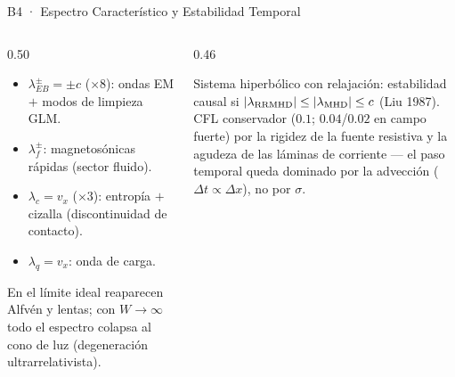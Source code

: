 \documentclass[aspectratio=169,9pt]{beamer}
\begin{document}
\begin{frame}{B4 · Espectro Caracter\'istico y Estabilidad Temporal}
\begin{columns}[T]
\begin{column}{0.50\textwidth}
  \begin{tcolorbox}[EQ={Los 14 autovalores \citep{miranda-aranguren-2018}}]
    \scriptsize
    \begin{itemize}\setlength\itemsep{2pt}
      \item $\lambda^\pm_{EB}=\pm c$ ($\times8$): ondas EM $+$ modos
            de limpieza GLM.
      \item $\lambda_f^\pm$: magnetos\'onicas r\'apidas (sector fluido).
      \item $\lambda_c=v_x$ ($\times3$): entrop\'ia $+$ cizalla
            (discontinuidad de contacto).
      \item $\lambda_q=v_x$: onda de carga.
    \end{itemize}
    En el l\'imite ideal reaparecen Alfv\'en y lentas; con $W\to\infty$
    todo el espectro colapsa al cono de luz (degeneraci\'on
    ultrarrelativista).
  \end{tcolorbox}
\end{column}
\begin{column}{0.46\textwidth}
  \begin{tcolorbox}[RES={Condici\'on subcaracter\'istica y CFL}]
    \scriptsize
    Sistema hiperb\'olico con relajaci\'on: estabilidad causal si
    $|\lambda_{\rm RRMHD}|\le|\lambda_{\rm MHD}|\le c$ (Liu 1987).\\[3pt]
    CFL conservador ($0.1$; $0.04$/$0.02$ en campo fuerte) por la rigidez
    de la fuente resistiva y la agudeza de las l\'aminas de corriente
    --- el paso temporal queda dominado por la advecci\'on
    ($\Delta t\propto\Delta x$), no por $\sigma$.
  \end{tcolorbox}
\end{column}
\end{columns}
\end{frame}
\end{document}
